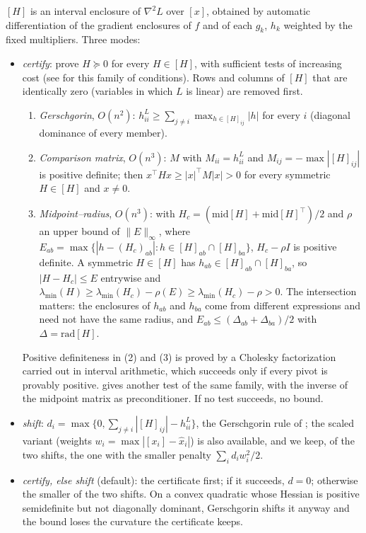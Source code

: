 \documentclass[11pt]{article}
\begin{document}
$[H]$ is an interval enclosure of $\nabla^2 L$ over $[x]$, obtained by automatic
differentiation of the gradient enclosures of $f$ and of each $g_k$, $h_k$ weighted by
the fixed multipliers. Three modes:
\begin{itemize}
\item \emph{certify}: prove $H \succeq 0$ for every $H \in [H]$, with sufficient
tests of increasing cost (see \citet{Hladik2018} for this family of conditions). Rows
and columns of $[H]$ that are identically zero (variables in which $L$ is linear) are
removed first.
\begin{enumerate}
\item \emph{Gerschgorin}, $O(n^2)$: $h^L_{ii} \ge \sum_{j \ne i} \max_{h \in [H]_{ij}} |h|$
for every $i$ (diagonal dominance of every member).
\item \emph{Comparison matrix}, $O(n^3)$: $M$ with $M_{ii} = h^L_{ii}$ and
$M_{ij} = -\max |[H]_{ij}|$ is positive definite; then
$x^\top H x \ge |x|^\top M |x| > 0$ for every symmetric
$H \in [H]$ and $x \ne 0$.
\item \emph{Midpoint--radius}, $O(n^3)$: with $H_c = (\mathrm{mid}[H] + \mathrm{mid}[H]^\top)/2$
and $\rho$ an upper bound of $\|E\|_\infty$, where
$E_{ab} = \max \{ |h - (H_c)_{ab}| : h \in [H]_{ab} \cap [H]_{ba} \}$, $H_c - \rho I$ is
positive definite. A symmetric $H \in [H]$ has $h_{ab} \in [H]_{ab} \cap [H]_{ba}$, so
$|H - H_c| \le E$ entrywise and
$\lambda_{\min}(H) \ge \lambda_{\min}(H_c) - \rho(E) \ge \lambda_{\min}(H_c) - \rho > 0$.
The intersection matters: the enclosures of $h_{ab}$ and $h_{ba}$ come from different
expressions and need not have the same radius, and $E_{ab} \le (\Delta_{ab} +
\Delta_{ba})/2$ with $\Delta = \mathrm{rad}[H]$.
\end{enumerate}
Positive definiteness in (2) and (3) is proved by a Cholesky factorization carried
out in interval arithmetic, which succeeds only if every pivot is provably positive.
\citet[Thm.~3.1]{Neumaier1996} gives another test of the same family, with the
inverse of the midpoint matrix as preconditioner.
If no test succeeds, no bound.
\item \emph{shift}: $d_i = \max\{0, \sum_{j\ne i} |[H]_{ij}| - h^L_{ii}\}$,
the Gerschgorin rule of \citet[Thm.~3.13 with $d = \mathbf 1$]{Adjiman1998a}; the
scaled variant (weights $w_i = \max |[x_i] - \hat x_i|$) is also available, and
we keep, of the two shifts, the one with the smaller penalty
$\sum_i d_i w_i^2/2$.
\item \emph{certify, else shift} (default): the certificate first; if it succeeds,
$d = 0$; otherwise the smaller of the two shifts. On a convex quadratic whose Hessian
is positive semidefinite but not diagonally dominant, Gerschgorin shifts it anyway and
the bound loses the curvature the certificate keeps.
\end{itemize}
\end{document}
